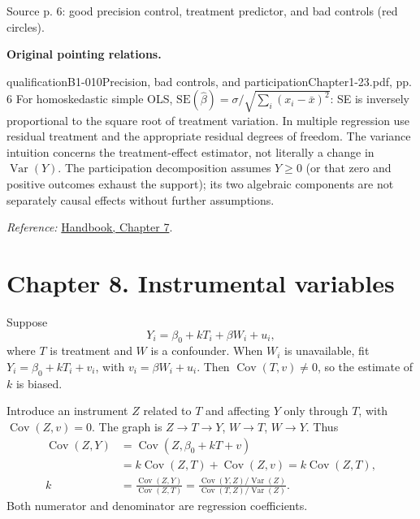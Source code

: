 {\begin{center}
\begin{tikzpicture}[>=Stealth, font=\small, line width=.65pt]
\end{tikzpicture}
\par{\small Source p. 6: good precision control, treatment predictor, and bad controls (red circles).}
\end{center}
\par{}\smallskip\textbf{Original pointing relations.}\par\smallskip
{}
\begin{reviewnote}{qualification}{B1-010}{Precision, bad controls, and participation}{Chapter1-23.pdf, pp. 6}
For homoskedastic simple OLS, $\mathrm{SE}(\hat\beta)=\sigma/\sqrt{\sum_i(x_i-\bar x)^2}$: SE is inversely proportional to the square root of treatment variation. In multiple regression use residual treatment and the appropriate residual degrees of freedom. The variance intuition concerns the treatment-effect estimator, not literally a change in $\operatorname{Var}(Y)$. The participation decomposition assumes $Y\ge0$ (or that zero and positive outcomes exhaust the support); its two algebraic components are not separately causal effects without further assumptions.
\par\smallskip\textit{Reference:} \href{https://matheusfacure.github.io/python-causality-handbook/07-Beyond-Confounders.html}{Handbook, Chapter 7}.
\end{reviewnote}
\section{Chapter 8. Instrumental variables}
Suppose
\[Y_i=\beta_0+kT_i+\beta W_i+u_i,\]
where $T$ is treatment and $W$ is a confounder. When $W_i$ is unavailable, fit $Y_i=\beta_0+kT_i+v_i$, with $v_i=\beta W_i+u_i$. Then $\operatorname{Cov}(T,v)\ne0$, so the estimate of $k$ is biased. 

Introduce an instrument $Z$ related to $T$ and affecting $Y$ only through $T$, with $\operatorname{Cov}(Z,v)=0$. The graph is $Z\to T\to Y$, $W\to T$, $W\to Y$. Thus
\begin{align*}
\operatorname{Cov}(Z,Y)&=\operatorname{Cov}(Z,\beta_0+kT+v)\\
&=k\operatorname{Cov}(Z,T)+\operatorname{Cov}(Z,v)=k\operatorname{Cov}(Z,T),\\
k&=\frac{\operatorname{Cov}(Z,Y)}{\operatorname{Cov}(Z,T)}
=\frac{\operatorname{Cov}(Y,Z)/\operatorname{Var}(Z)}{\operatorname{Cov}(T,Z)/\operatorname{Var}(Z)}.
\end{align*}
Both numerator and denominator are regression coefficients. 

}
